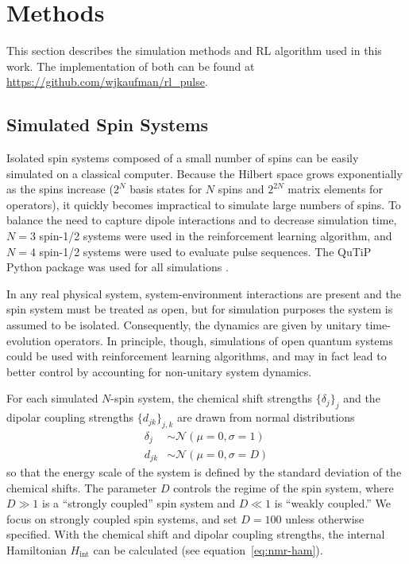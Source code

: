 
\chapter{Methods} %



This section describes the simulation methods and RL algorithm used in this work. The implementation of both can be found at \url{https://github.com/wjkaufman/rl_pulse}.

\section{Simulated Spin Systems}

Isolated spin systems composed of a small number of spins can be easily simulated on a classical computer. Because the Hilbert space grows exponentially as the spins increase ($2^N$ basis states for $N$ spins and $2^{2N}$ matrix elements for operators), it quickly becomes impractical to simulate large numbers of spins. To balance the need to capture dipole interactions and to decrease simulation time, $N=3$ spin-1/2 systems were used in the reinforcement learning algorithm, and $N=4$ spin-1/2 systems were used to evaluate pulse sequences. The QuTiP Python package was used for all simulations \cite{Johansson_2013}.

In any real physical system, system-environment interactions are present and the spin system must be treated as open, but for simulation purposes the system is assumed to be isolated.
Consequently, the dynamics are given by unitary time-evolution operators. In principle, though, simulations of open quantum systems could be used with reinforcement learning algorithms, and may in fact lead to better control by accounting for non-unitary system dynamics.

For each simulated $N$-spin system, the chemical shift strengths $\{\delta_j\}_j$ and the dipolar coupling strengths $\{d_{jk}\}_{j,k}$ are drawn from normal distributions
\begin{align*}
    \delta_j &\sim \mathcal{N}(\mu=0, \sigma=1) \\
    d_{jk} &\sim \mathcal{N}(\mu=0, \sigma=D)
\end{align*}
so that the energy scale of the system is defined by the standard deviation of the chemical shifts. The parameter $D$ controls the regime of the spin system, where $D \gg 1$ is a ``strongly coupled'' spin system and $D \ll 1$ is ``weakly coupled.'' We focus on strongly coupled spin systems, and set $D = 100$ unless otherwise specified. With the chemical shift and dipolar coupling strengths, the internal Hamiltonian $H_{\text{int}}$ can be calculated (see equation~\ref{eq:nmr-ham}).

